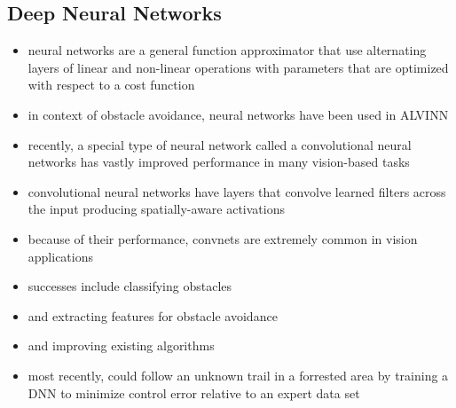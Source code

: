 \documentclass[paper=a4, fontsize=11pt]{scrartcl} %
\begin{document}
	\subsection{Deep Neural Networks}
	\begin{itemize}
		\item neural networks are a general function approximator that use alternating layers of linear and non-linear operations with parameters that are optimized with respect to a cost function
		\item in context of obstacle avoidance, neural networks have been used in ALVINN \cite{Pomerleau1989,Michels2005,riedmiller2009reinforcement}
		\item recently, a special type of neural network called a convolutional neural networks \cite{DBLP:journals/corr/SzegedyLJSRAEVR14} has vastly improved performance in many vision-based tasks
		\item convolutional neural networks have layers that convolve learned filters across the input producing spatially-aware activations
		\item because of their performance, convnets are extremely common in vision applications
		\item successes include classifying obstacles \cite{Hadsell2009} 
		\item and extracting features for obstacle avoidance
		\item and improving existing algorithms \cite{Kim2015}
		\item most recently, \cite{Guisti2016} could follow an unknown trail in a forrested area by training a DNN to minimize control error relative to an expert data set
	\end{itemize}
\end{document}

